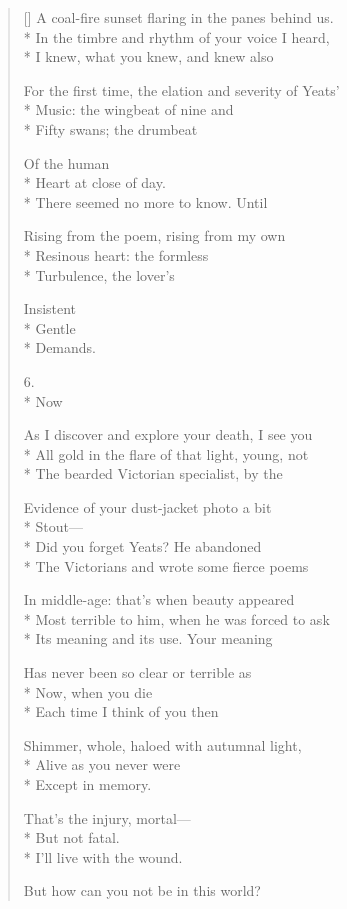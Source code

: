 \begin{verse}[\versewidth]
A coal-fire sunset flaring in the panes behind us.\\*
In the timbre and rhythm of your voice I heard,\\*
I knew, what you knew, and knew also

For the first time, the elation and severity of Yeats'\\*
Music: the wingbeat of nine and\\*
Fifty swans; the drumbeat

Of the human\\*
Heart at close of day.\\*
There seemed no more to know. Until

Rising from the poem, rising from my own\\*
Resinous heart: the formless\\*
Turbulence, the lover's

Insistent\\*
Gentle\\*
Demands.

6.\\*
Now

As I discover and explore your death, I see you\\*
All gold in the flare of that light, young, not\\*
The bearded Victorian specialist, by the

Evidence of your dust-jacket photo a bit\\*
Stout---\\*
\hspace{2\vgap} Did you forget Yeats? He abandoned\\*
The Victorians and wrote some fierce poems

In middle-age: that's when beauty appeared\\*
Most terrible to him, when he was forced to ask\\*
Its meaning and its use. Your meaning

Has never been so clear or terrible as\\*
Now, when you die\\*
Each time I think of you \qquad then

Shimmer, whole, haloed with autumnal light,\\*
Alive as you never were\\*
Except in memory.

That's the injury, mortal---\\*
But not fatal.\\*
I'll live with the wound.

But how can you not be in this world?
\end{verse}
